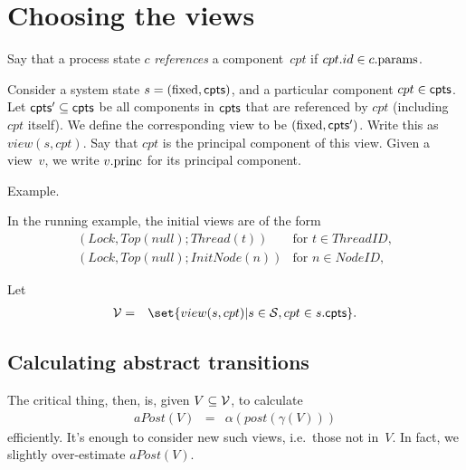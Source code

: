 
\section{Choosing the views}

Say that a process state $c$ \emph{references} a component~$cpt$ if
$cpt.id \in c.\mathrm{params}$. 

Consider a system state $s = (\mathrm{fixed}, \mathsf{cpts})$, and a particular component $cpt
\in \mathsf{cpts}$.  Let $\mathsf{cpts}' \subseteq \mathsf{cpts}$ be all components in $\mathsf{cpts}$ that are
referenced by $cpt$ (including $cpt$ itself).  We define the corresponding
view to be $(\mathrm{fixed}, \mathsf{cpts}')$.  Write this as $view(s, cpt)$.  Say that $cpt$
is the principal component of this view.  Given a view~$v$, we write
$v.\mathrm{princ}$ for its principal component.

Example.

In the running example, the initial views are of the form
\[
\begin{array}{ll}
(Lock, Top(null); Thread(t)) &  \mbox{for $t \in ThreadID$}, \\
(Lock, Top(null); InitNode(n)) & \mbox{for $n \in NodeID$},
\end{array}
\]


Let 
\begin{eqnarray*}
\V & = & 
  \set{view(s, cpt) | s \in \S, cpt \in s.\cpt}. %
\end{eqnarray*}



\subsection{Calculating abstract transitions}

The critical thing, then, is, given $V \subseteq \mathcal{V}$, to calculate
\begin{eqnarray*}
aPost(V) & = & \alpha(post(\gamma(V)))
\end{eqnarray*}
efficiently.  It's enough to consider new such views, i.e.~those not in~$V$.
In fact, we slightly over-estimate $aPost(V)$.


